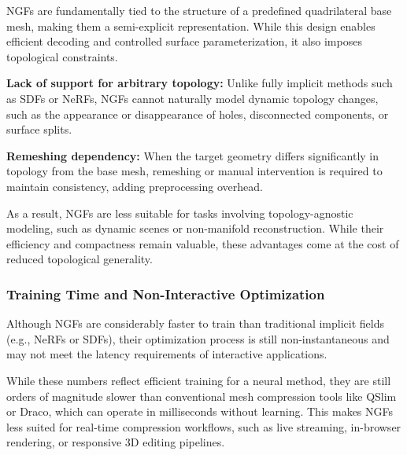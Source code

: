 NGFs are fundamentally tied to the structure of a predefined quadrilateral base mesh, making them a semi-explicit representation. 
While this design enables efficient decoding and controlled surface parameterization, it also imposes topological constraints. 

\textbf{Lack of support for arbitrary topology:} Unlike fully implicit methods such as SDFs or NeRFs, NGFs cannot naturally model dynamic topology changes, such as the appearance or disappearance of holes, disconnected components, or surface splits. 

\textbf{Remeshing dependency:} When the target geometry differs significantly in topology from the base mesh, remeshing or manual intervention is required to maintain consistency, adding preprocessing overhead. 

As a result, NGFs are less suitable for tasks involving topology-agnostic modeling, such as dynamic scenes or non-manifold reconstruction. 
While their efficiency and compactness remain valuable, these advantages come at the cost of reduced topological generality. 

\subsubsection{Training Time and Non-Interactive Optimization}

Although NGFs are considerably faster to train than traditional implicit fields (e.g., NeRFs or SDFs), their optimization process is still non-instantaneous and may not meet the latency requirements of interactive applications. 

\begin{table}[h]
\centering
{}
\caption{NGF Training and Inference Time (on RTX 2080 Ti)}
\end{table}

While these numbers reflect efficient training for a neural method, they are still orders of magnitude slower than conventional mesh compression tools like QSlim or Draco, which can operate in milliseconds without learning. 
This makes NGFs less suited for real-time compression workflows, such as live streaming, in-browser rendering, or responsive 3D editing pipelines. 

